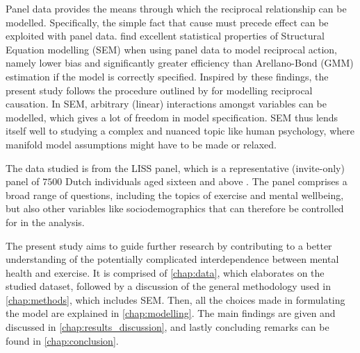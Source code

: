 Panel data provides the means through which the reciprocal relationship can be modelled. Specifically, the simple fact
that cause must precede effect can be exploited with panel data.
 find excellent statistical properties of Structural Equation modelling (SEM)
when using panel data to model reciprocal action, namely lower bias and significantly greater efficiency than Arellano-Bond
(GMM) estimation if the model is correctly specified.
Inspired by these findings, the present study follows the procedure outlined by 
for modelling reciprocal causation.
In SEM, arbitrary (linear) interactions amongst variables can be modelled, which gives a lot of freedom in model
specification. SEM thus lends itself well to studying a complex and nuanced topic like human psychology,
where manifold model assumptions might have to be made or relaxed.

The data studied is from the LISS panel, which is a representative (invite-only) panel of $7500$ Dutch individuals aged
sixteen and above \cite{scherpenzeel2010liss}. The panel comprises a broad range of questions, including the topics of exercise
and mental wellbeing, but also other variables like sociodemographics that can therefore be controlled for in the analysis.

The present study aims to guide further research by contributing to a better understanding of the potentially
complicated interdependence between mental health and exercise.
It is comprised of \cref{chap:data}, which elaborates on the studied dataset, followed by a discussion of the
general methodology used in \cref{chap:methods}, which includes SEM.
Then, all the choices made in formulating the model are explained in \cref{chap:modelling}.
The main findings are given and discussed in \cref{chap:results_discussion},
and lastly concluding remarks can be found in \cref{chap:conclusion}.

